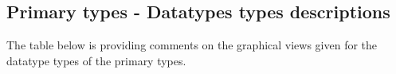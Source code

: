 \subsection{Primary types - Datatypes types descriptions}





The table below is providing comments on the graphical views given for the datatype types of the primary types.


\begin{datadictionary}

\end{datadictionary}







